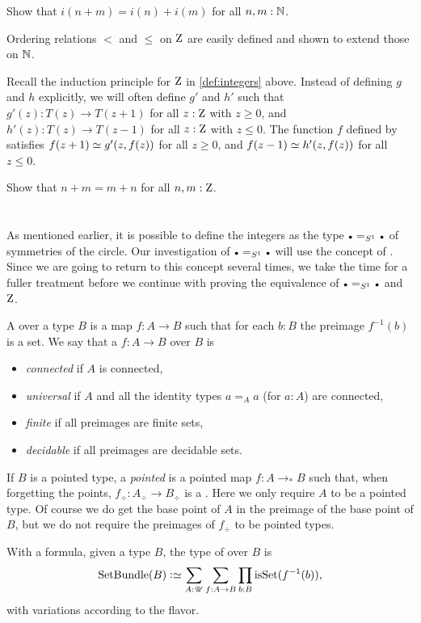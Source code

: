 \begin{xca}\label{xca:addition-on-Z-and-N}
Show that $i(n+m)=i(n)+i(m)$ for all $n,m:\mathbb{N}$.
\end{xca}

Ordering relations $<$ and $\leq$ on $\mathrm{Z}$ are easily defined
and shown to extend those on $\mathbb{N}$.

Recall the induction principle for $\mathrm{Z}$ in \cref{def:integers} above.
Instead of defining $g$ and $h$ explicitly, we will often
define $g'$ and $h'$ such that $g'(z): T(z)\to T(z+1)$ 
for all $z:\mathrm{Z}$ with $z\geq 0$, and $h'(z): T(z)\to T(z-1)$ 
for all $z:\mathrm{Z}$ with $z\leq 0$. The function $f$ defined by 
satisfies $f(z+1)\jdeq g'(z,f(z))$ for all $z\geq 0$,
and $f(z-1)\jdeq h'(z,f(z))$ for all $z\leq 0$.

\begin{xca}\label{xca:commutative-add-Z}
Show that $n+m = m+n$ for all $n,m:\mathrm{Z}$.  
\end{xca}


\section{\Coverings}
\label{sec:covering}

As mentioned earlier, it is possible to define the integers as the
type $\base=_{S^1}\base$ of symmetries of the circle.
Our investigation of $\base=_{S^1}\base$ will use the concept of \coverings. 
Since we are going to return to this concept several times, 
we take the time for a fuller treatment before we continue with
proving the equivalence of $\base=_{S^1}\base$ and $\mathrm{Z}$.

\begin{definition}\label{def:covering}
A \emph{\covering} over a type $B$ 
is a map $f:A\to B$ such that for each $b:B$ the preimage $f^{-1}(b)$ is a set.
We say that a \covering $f:A\to B$ over $B$ is
\begin{itemize}
\item \emph{connected} if $A$ is connected, 
\item \emph{universal} if $A$ and all 
the identity types $a=_Aa$ (for $a:A$) are connected, 
\item \emph{finite} if all preimages are finite sets,
\item \emph{decidable} if all preimages are decidable sets.
\end{itemize}
If $B$ is a pointed type, a \emph{pointed} \covering is a pointed map $f:A\to_*B$ such that, when forgetting the points, $f_\div:A_\div\to B_\div$ is a \covering. Here we only
require $A$ to be a pointed type. Of course we do get the base point of $A$ in the 
preimage of the base point of $B$, but we do not require the preimages of $f_\div$
to be pointed types.
\end{definition}
With a formula, given a type $B$, the type of \coverings over $B$ is
\[
\SetBundle(B) \defeq \sum_{A:\UU}\sum_{f:A\to B}\prod_{b:B}\isset(f^{-1}(b)),
\]
with variations according to the flavor.

